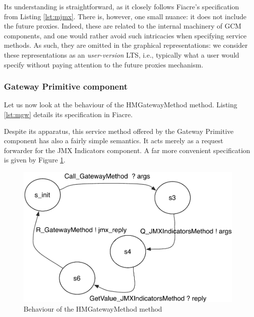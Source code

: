 		
	\noindent Its understanding is straightforward, as it closely follows Fiacre's specification
	from Listing \ref{lst:mjmx}. There is, however, one	 small nuance: it does not include the 
	future proxies. Indeed, these are related to the internal machinery of 
	\ac{GCM} components, and one would rather avoid such intricacies when specifying service
	methods. As such, they are omitted in the graphical representations: we consider these representations
	as an \textit{user-version} \ac{LTS}, i.e., typically what a user would specify without paying 
	attention to the future proxies mechanism. 
			

\subsubsection{\textsf{Gateway Primitive} component}	
	
	Let us now look at the behaviour of the \textsf{HMGatewayMethod} method. Listing
	\ref{lst:mgw} details its specification in Fiacre.		
	
			
			
	\noindent Despite its apparatus, this service method offered by the \textsf{Gateway Primitive} component 
	has also a fairly simple semantics. It acts merely as a request forwarder for the \textsf{JMX Indicators} component.
	A far more convenient specification is given by Figure \ref{fig:GwM}.	
	     
	\begin{figure}[H]
		 \centering
		\includegraphics[scale=0.6]{figures/chapter3/HMGatewayMethod.pdf}
		\caption{Behaviour of the HMGatewayMethod method}
		\label{fig:GwM}		
	\end{figure}		

